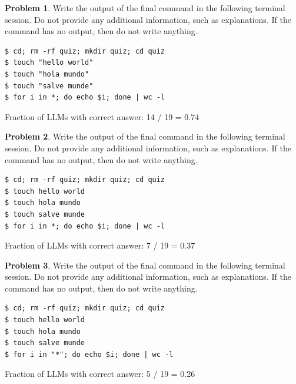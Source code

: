 \documentclass[10pt]{article}
\theoremstyle{definition}
\newtheorem{problem}{Problem}
\begin{document}
\noindent\vspace{0.1in}\begin{minipage}{\textwidth}

\begin{problem}
Write the output of the final command in the following terminal session.
Do not provide any additional information,
such as explanations.
If the command has no output,
then do not write anything.

\end{problem}
\begin{lstlisting}
$ cd; rm -rf quiz; mkdir quiz; cd quiz
$ touch "hello world"
$ touch "hola mundo"
$ touch "salve munde"
$ for i in *; do echo $i; done | wc -l
\end{lstlisting}

Fraction of LLMs with correct answer: 14 / 19 = 0.74
\end{minipage}
\noindent\vspace{0.1in}\begin{minipage}{\textwidth}

\begin{problem}
Write the output of the final command in the following terminal session.
Do not provide any additional information,
such as explanations.
If the command has no output,
then do not write anything.

\end{problem}
\begin{lstlisting}
$ cd; rm -rf quiz; mkdir quiz; cd quiz
$ touch hello world
$ touch hola mundo
$ touch salve munde
$ for i in *; do echo $i; done | wc -l
\end{lstlisting}

Fraction of LLMs with correct answer: 7 / 19 = 0.37
\end{minipage}
\noindent\vspace{0.1in}\begin{minipage}{\textwidth}

\begin{problem}
Write the output of the final command in the following terminal session.
Do not provide any additional information,
such as explanations.
If the command has no output,
then do not write anything.

\end{problem}
\begin{lstlisting}
$ cd; rm -rf quiz; mkdir quiz; cd quiz
$ touch hello world
$ touch hola mundo
$ touch salve munde
$ for i in "*"; do echo $i; done | wc -l
\end{lstlisting}

Fraction of LLMs with correct answer: 5 / 19 = 0.26
\end{minipage}
\end{document}
